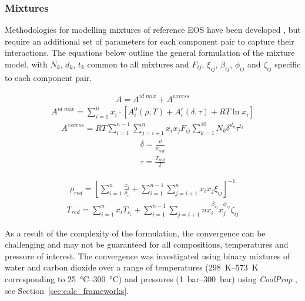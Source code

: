        \subsubsection{Mixtures}
        Methodologies for modelling mixtures of reference \ac{EOS} have been developed \cite{Lemmon1999b}, but require an additional set of parameters for each component pair to capture their interactions. The equations below outline the general formulation of the mixture model, with \(N_k\), \(d_k\), \(t_k\) common to all mixtures and \(F_{ij}\), \(\xi_{ij}\), \(\beta_{ij}\), \(\phi_{ij}\) and \(\zeta_{ij}\) specific to each component pair.

        \begin{align}
            A = A^{id\;mix} + A^{excess} \label{eq:HEOS_mixture}
        \end{align}
        \begin{align}
            A^{id\;mix} = \sum_{i=1}^n x_i \cdot \left[A^0_i(\rho,T) + A^r_i(\delta, \tau) + R T \ln x_i\right] \label{eq:HEOSmixture_id_term}
        \end{align}
        \begin{align}
            A^{excess} = RT \sum_{i=1}^{n-1} \sum_{j=i+1}^n x_i x_j F_{ij} \sum_{k=1}^{10} N_k \delta^{d_k} \tau^{t_k} \label{eq:HEOS_excess}
        \end{align}
        \begin{align}
            \delta = \frac{\rho}{\rho_{red}} \label{eq:reduced_density}
        \end{align}
        \begin{align}
            \tau = \frac{T_{red}}{T} \label{eq:reduced_temperature}
        \end{align}

        \begin{align}
            \rho_{red} = \left[\sum_{i=1}^n \frac{x_i}{\rho_c} + \sum_{i=1}^{n-1} \sum_{j=i+1}^n x_i x_j \xi_{ij} \right]^{-1} \label{eq:red_density}
        \end{align}
        \begin{align}
            T_{red} = \sum_{i=1}^{n} x_i T_{c_i} + \sum_{i=1}^{n-1} \sum_{j=i+1}{n} x_i^{\beta_{ij}} x_j^{\phi_{ij}}\zeta_{ij} \label{eq:red_temperature}
        \end{align}

    As a result of the complexity of the formulation, the convergence can be challenging and may not be guaranteed for all compositions, temperatures and pressure of interest. The convergence was investigated using binary mixtures of water and carbon dioxide over a range of temperatures (\qtyrange{298}{573}{\K} corresponding to \qtyrange{25}{300}{\degreeCelsius}) and pressures (\qtyrange{1}{300}{\bar}) using \emph{CoolProp} \cite{Bell2014}, see Section~\ref{sec:calc_frameworks}. 


